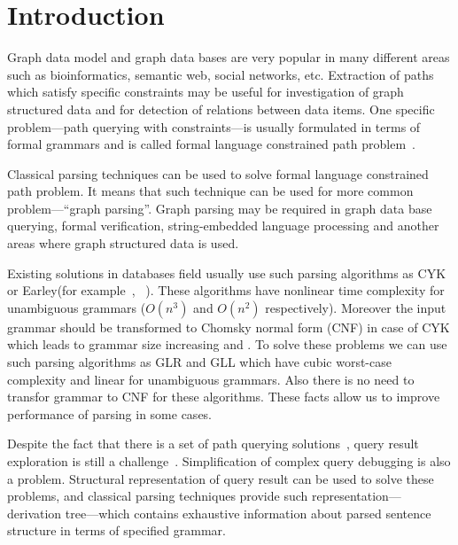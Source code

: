\documentclass{sig-alternate} %
\begin{document}
\section{Introduction}
Graph data model and graph data bases are very popular in many different areas such as bioinformatics, semantic web, social networks, etc.
Extraction of paths which satisfy specific constraints may be useful for investigation of graph structured data and for detection of relations between data items.
One specific problem---path querying with constraints---is usually formulated in terms of formal grammars and is called formal language constrained path problem~\cite{FLCpathProblem}.


Classical parsing techniques can be used to solve formal language constrained path problem. 
It means that such technique can be used for more common problem---``graph parsing''. 
Graph parsing may be required in graph data base querying, formal verification, string-embedded language processing and another areas where graph structured data is used. 

Existing solutions in databases field usually use such parsing algorithms as CYK or Earley(for example~\cite{ConjCFPathQuery}, ~\cite{GraphQueryWithEarley}). 
These algorithms have nonlinear time complexity for unambiguous grammars ($O(n^3)$ and $O(n^2)$ respectively).
Moreover the input grammar should be transformed to Chomsky normal form (CNF) in case of CYK which leads to grammar size increasing and .
To solve these problems we can use such parsing algorithms as GLR and GLL which have cubic worst-case complexity and linear for unambiguous grammars.
Also there is no need to transfor grammar to CNF for these algorithms.
These facts allow us to improve performance of parsing in some cases.

Despite the fact that there is a set of path querying solutions~\cite{GraphQueryWithEarley, ConjCFPathQuery, !!!}, query result exploration is still a challenge~\cite{hofman2015separabilityForRegQueryDebugging}. 
Simplification of complex query debugging is also a problem.
Structural representation of query result can be used to solve these problems, and classical parsing techniques provide such representation---derivation tree---which contains exhaustive information about parsed sentence structure in terms of specified grammar.
\end{document}

